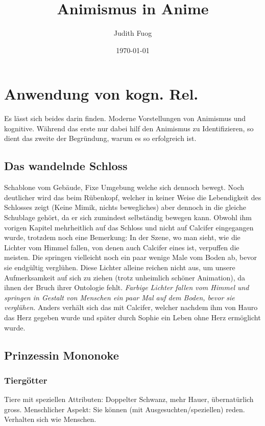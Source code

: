 \documentclass[a4paper]{article}
\title{Animismus in Anime}
\author{Judith Fuog}
\date{\today}
\begin{document}
\maketitle
\tableofcontents
\newpage






\newpage
\section{Anwendung von kogn. Rel.}
Es lässt sich beides darin finden. Moderne Vorstellungen von Animismus und kognitive. Während das erste nur dabei hilf den Animismus zu Identifizieren, so dient das zweite der Begründung, warum es so erfolgreich ist.

\subsection{Das wandelnde Schloss}
Schablone vom Gebäude, Fixe Umgebung welche sich dennoch bewegt. Noch deutlicher wird das beim Rübenkopf, welcher in keiner Weise die Lebendigkeit des Schlosses zeigt (Keine Mimik, nichts bewegliches) aber dennoch in die gleiche Schublage gehört, da er sich zumindest selbständig bewegen kann.
Obwohl ihm vorigen Kapitel mehrheitlich auf das Schloss und nicht auf Calcifer eingegangen wurde, trotzdem noch eine Bemerkung: In der Szene, wo man sieht, wie die Lichter vom Himmel fallen, von denen auch Calcifer eines ist, verpuffen die meisten. Die springen vielleicht noch ein paar wenige Male vom Boden ab, bevor sie endgültig verglühen. Diese Lichter alleine reichen nicht aus, um unsere Aufmerksamkeit auf sich zu ziehen (trotz unheimlich schöner Animation), da ihnen der Bruch ihrer Ontologie fehlt. \emph{Farbige Lichter fallen vom Himmel und springen in Gestalt von Menschen ein paar Mal auf dem Boden, bevor sie verglühen.} Anders verhält sich das mit Calcifer, welcher nachdem ihm von Hauro das Herz gegeben wurde und später durch Sophie ein Leben ohne Herz ermöglicht wurde.

\subsection{Prinzessin Mononoke}
\subsubsection*{Tiergötter}
Tiere mit speziellen Attributen: Doppelter Schwanz, mehr Hauer, übernatürlich gross. Menschlicher Aspekt: Sie können (mit Ausgesuchten/speziellen) reden. Verhalten sich wie Menschen.
\end{document}
